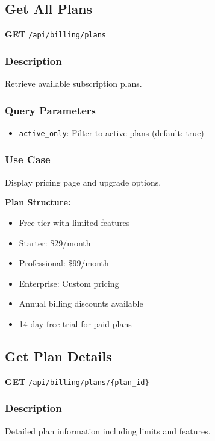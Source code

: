 \documentclass[11pt,a4paper]{report}
\begin{document}
\subsection{Get All Plans}

\textbf{GET} \texttt{/api/billing/plans}

\subsubsection{Description}
Retrieve available subscription plans.

\subsubsection{Query Parameters}
\begin{itemize}[leftmargin=*]
    \item \texttt{active\_only}: Filter to active plans (default: true)
\end{itemize}

\subsubsection{Use Case}
Display pricing page and upgrade options.

\begin{infobox}
\textbf{Plan Structure:}
\begin{itemize}[leftmargin=*]
    \item Free tier with limited features
    \item Starter: \$29/month
    \item Professional: \$99/month
    \item Enterprise: Custom pricing
    \item Annual billing discounts available
    \item 14-day free trial for paid plans
\end{itemize}
\end{infobox}

\subsection{Get Plan Details}

\textbf{GET} \texttt{/api/billing/plans/\{plan\_id\}}

\subsubsection{Description}
Detailed plan information including limits and features.
\end{document}
